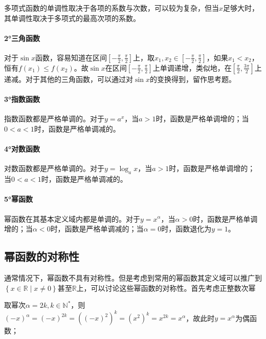 多项式函数的单调性取决于各项的系数与次数，可以较为复杂，但当\(x\)足够大时，其单调性取决于多项式的最高次项的系数。

\paragraph{2°三角函数} \mbox{}

对于\(\sin x\)函数，容易知道在区间\(\left[ - \frac{\pi}{2} , \frac{\pi}{2} \right]\)上，取\(x_{1} , x_{2} \in \left[ - \frac{\pi}{2} , \frac{\pi}{2} \right]\)，如果\(x_{1} < x_{2}\)，恒有\(f(x_{1}) \le f(x_{2})\)。故\(\sin x\)在区间\(\left[ - \frac{\pi}{2} , \frac{\pi}{2} \right]\)上单调递增，类似地，在\(\left[ \frac{\pi}{2} , \frac{3 \pi}{2} \right]\)上递减。对于其他的三角函数，可以通过对\(\sin x\)的变换得到，留作思考题。

\paragraph{3°指数函数} \mbox{}

指数函数都是严格单调的。对于\(y = a^{x}\)，当\(a > 1\)时，函数是严格单调增的；当\(0 < a < 1\)时，函数是严格单调减的。

\paragraph{4°对数函数} \mbox{}

对数函数都是严格单调的。对于\(y = \log_{a} x\)，当\(a > 1\)时，函数是严格单调增的；当\(0 < a < 1\)时，函数是严格单调减的。

\paragraph{5°幂函数} \mbox{}

幂函数在其基本定义域内都是单调的。对于\(y = x^{\alpha}\)，当\(\alpha > 0\)时，函数是严格单调增的；当\(\alpha < 0\)时，函数是严格单调减的；当\(\alpha = 0\)时，函数退化为\(y = 1\)。


\subsection{幂函数的对称性}
通常情况下，幂函数不具有对称性。但是考虑到常用的幂函数其定义域可以推广到\(\left\{ x \in \mathbb{R} \mid x \ne 0 \right\}\)甚至\(\mathbb{R}\)上，可以讨论这些幂函数的对称性。首先考虑正整数次幂

取幂次\(\alpha = 2 k , k \in \mathbb{N}^{*}\)，则\({\left( - x \right)}^{\alpha} = {\left( - x \right)}^{2 k} = {\left( {\left( - x \right)}^{2} \right)}^{k} = {\left( x^{2} \right)}^{k} = x^{2 k} = x^{\alpha}\)，故此时\(y = x^{\alpha}\)为偶函数；

